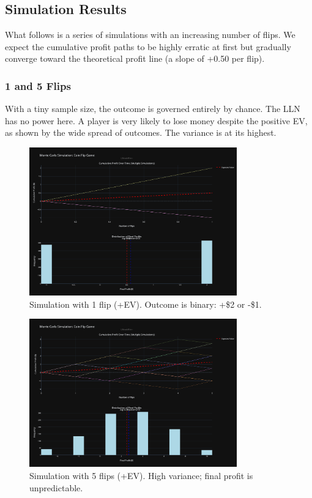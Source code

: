 \documentclass[12pt]{article}
\begin{document}
\subsection{Simulation Results}
What follows is a series of simulations with an increasing number of flips. We expect the cumulative profit paths to be highly erratic at first but gradually converge toward the theoretical profit line (a slope of +0.50 per flip).

\subsubsection{1 and 5 Flips}
With a tiny sample size, the outcome is governed entirely by chance. The LLN has no power here. A player is very likely to lose money despite the positive EV, as shown by the wide spread of outcomes. The variance is at its highest.

\begin{figure}[h!]
\centering
\includegraphics[width=0.8\textwidth]{+ev/1+ev.png}
\caption{Simulation with 1 flip (+EV). Outcome is binary: +\$2 or -\$1.}
\end{figure}

\begin{figure}[h!]
\centering
\includegraphics[width=0.8\textwidth]{+ev/5+ev.png}
\caption{Simulation with 5 flips (+EV). High variance; final profit is unpredictable.}
\end{figure}
\clearpage
\end{document}
